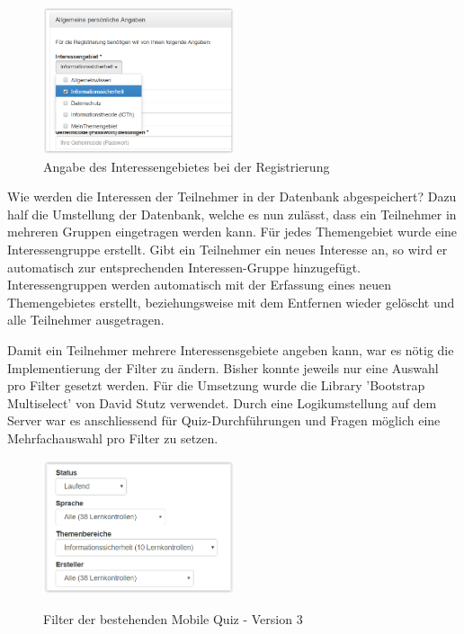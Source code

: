 \begin{figure}[H]
	\centering
	\includegraphics[width=0.5\textwidth]{Images/Themengebiet_Angabe_Registrierung.PNG}
	\caption{Angabe des Interessengebietes bei der Registrierung}
\end{figure}

Wie werden die Interessen der Teilnehmer in der Datenbank abgespeichert? Dazu half die Umstellung der Datenbank, welche es nun zulässt, dass ein Teilnehmer in mehreren Gruppen eingetragen werden kann.
Für jedes Themengebiet wurde eine Interessengruppe erstellt. Gibt ein Teilnehmer ein neues Interesse an, so wird er automatisch zur entsprechenden Interessen-Gruppe hinzugefügt. Interessengruppen werden automatisch mit der Erfassung eines neuen Themengebietes erstellt, beziehungsweise mit dem Entfernen wieder gelöscht und alle Teilnehmer ausgetragen.

\bigskip

Damit ein Teilnehmer mehrere Interessensgebiete angeben kann, war es nötig die Implementierung der Filter zu ändern. Bisher konnte jeweils nur eine Auswahl pro Filter gesetzt werden. Für die Umsetzung wurde die Library 'Bootstrap Multiselect' \cite{bootstrap_multiselect} von David Stutz verwendet. Durch eine Logikumstellung auf dem Server war es anschliessend für Quiz-Durchführungen und Fragen möglich eine Mehrfachauswahl pro Filter zu setzen.

\begin{figure}[H]
	\centering
	\includegraphics[width=0.5\textwidth]{Images/Alte_Filter_Mobile_Quiz.PNG}
	\caption{Filter der bestehenden Mobile Quiz - Version 3}
	\cite{mobilequiz.ch}
\end{figure}

